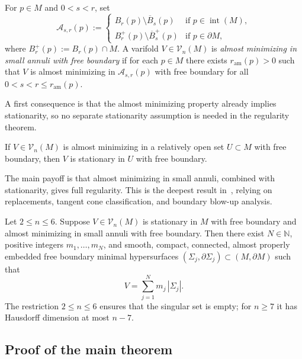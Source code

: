 \begin{definition}\label{def:am-small-annuli}
For $p\in M$ and $0<s<r$, set
\[
\mathcal{A}_{s,r}(p):=
\begin{cases}
B_r(p)\setminus\overline{B}_s(p) & \text{if } p\in\operatorname{int}(M),\\
B_r^+(p)\setminus\overline{B}^+_s(p) & \text{if } p\in\partial M,
\end{cases}
\]
where $B_r^+(p):=B_r(p)\cap M$. A varifold $V\in\mathcal{V}_n(M)$ is \emph{almost minimizing in small annuli with free boundary} if for each $p\in M$ there exists $r_{\mathrm{am}}(p)>0$ such that $V$ is almost minimizing in $\mathcal{A}_{s,r}(p)$ with free boundary for all $0<s<r\le r_{\mathrm{am}}(p)$.
\end{definition}

A first consequence is that the almost minimizing property already implies stationarity, so no separate stationarity assumption is needed in the regularity theorem.

\begin{proposition}[{\cite[Proposition~4.21]{LZ17}}]\label{prop:am-stationary}
If $V\in\mathcal{V}_n(M)$ is almost minimizing in a relatively open set $U\subset M$ with free boundary, then $V$ is stationary in $U$ with free boundary.
\end{proposition}

The main payoff is that almost minimizing in small annuli, combined with stationarity, gives full regularity. This is the deepest result in~\cite{LZ17}, relying on replacements, tangent cone classification, and boundary blow-up analysis.

\begin{theorem}\label{thm:main-regularity}
Let $2\le n\le 6$. Suppose $V\in\mathcal{V}_n(M)$ is stationary in $M$ with free boundary and almost minimizing in small annuli with free boundary. Then there exist $N\in\mathbb{N}$, positive integers $m_1,\ldots,m_N$, and smooth, compact, connected, almost properly embedded free boundary minimal hypersurfaces $(\Sigma_j,\partial\Sigma_j)\subset(M,\partial M)$ such that
\[
V=\sum_{j=1}^N m_j\,|\Sigma_j|.
\]
The restriction $2 \leq n \leq 6$ ensures that the singular set is empty; for $n \geq 7$ it has Hausdorff dimension at most $n - 7$.
\end{theorem}

\subsection{Proof of the main theorem}\label{sec:main-proof}

